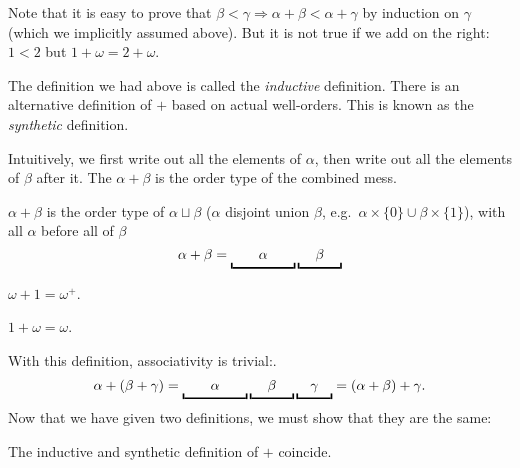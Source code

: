 \documentclass[a4paper]{article}
\begin{document}
Note that it is easy to prove that $\beta < \gamma \Rightarrow \alpha + \beta < \alpha + \gamma$ by induction on $\gamma$ (which we implicitly assumed above). But it is not true if we add on the right: $1 < 2$ but $1 + \omega = 2 + \omega$.

The definition we had above is called the \emph{inductive} definition. There is an alternative definition of $+$ based on actual well-orders. This is known as the \emph{synthetic} definition.

Intuitively, we first write out all the elements of $\alpha$, then write out all the elements of $\beta$ after it. The $\alpha + \beta$ is the order type of the combined mess.

\begin{defi}
  $\alpha + \beta$ is the order type of $\alpha \sqcup \beta$ ($\alpha$ disjoint union $\beta$, e.g.\ $\alpha\times \{0\}\cup \beta\times \{1\}$), with all $\alpha$ before all of $\beta$
  \[
    \alpha + \beta = \underbracket{\quad\quad\vphantom{\beta}\alpha\vphantom{\beta}\quad\quad}\underbracket{\quad\;\beta\;\quad}
  \]
\end{defi}
\begin{eg}
  $\omega + 1 = \omega^+$.

  $1 + \omega = \omega$.
\end{eg}

With this definition, associativity is trivial:.
\[
  \alpha + (\beta + \gamma) = \underbracket{\quad\quad\vphantom{\beta}\alpha\vphantom{\beta}\quad\quad}\underbracket{\quad\;\beta\;\quad}\underbracket{\quad\gamma\quad} = (\alpha + \beta) + \gamma.
\]
Now that we have given two definitions, we must show that they are the same:
\begin{prop}
  The inductive and synthetic definition of $+$ coincide.
\end{prop}
\end{document}
